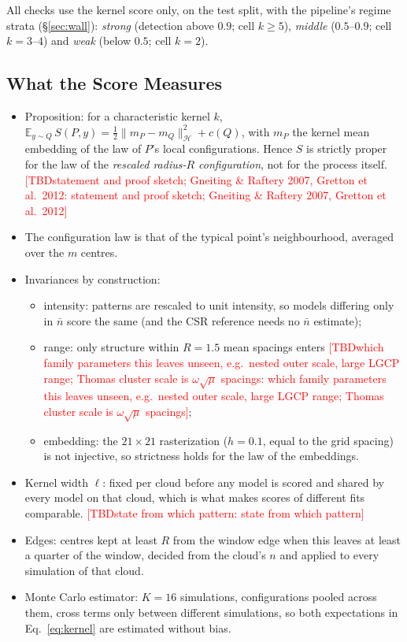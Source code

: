 \documentclass[twoside]{article}
\newcommand{\TBD}[1]{\textcolor{red}{[TBD\ifx\relax#1\relax\else: #1\fi]}}
\newcommand{\nb}{\bar n}
\begin{document}
All checks use the kernel score only, on the test split, with the pipeline's regime strata (\S\ref{sec:wall}):
\emph{strong} (detection above $0.9$; cell $k\ge5$), \emph{middle} ($0.5$--$0.9$; cell $k=3$--$4$) and \emph{weak}
(below $0.5$; cell $k=2$).

\subsection{What the Score Measures}
\label{app:score-def}

\begin{itemize}
  \item Proposition: for a characteristic kernel $k$, $\mathbb{E}_{y\sim Q}\,S(P,y)
        =\tfrac12\|m_P-m_Q\|_{\mathcal H}^2+c(Q)$, with $m_P$ the kernel mean embedding of the law of $P$'s local
        configurations. Hence $S$ is strictly proper for the law of the \emph{rescaled radius-$R$ configuration},
        not for the process itself. \TBD{statement and proof sketch; Gneiting \& Raftery 2007, Gretton et al.\ 2012}
  \item The configuration law is that of the typical point's neighbourhood, averaged over
        the $m$ centres.
  \item Invariances by construction:
  \begin{itemize}
    \item intensity: patterns are rescaled to unit intensity, so models differing only in $\nb$ score the same
          (and the CSR reference needs no $\nb$ estimate);
    \item range: only structure within $R=1.5$ mean spacings enters \TBD{which family parameters this leaves
          unseen, e.g.\ nested outer scale, large LGCP range; Thomas cluster scale is $\omega\sqrt{\mu}$ spacings};
    \item embedding: the $21\times21$ rasterization ($h=0.1$, equal to the grid spacing) is not injective, so
          strictness holds for the law of the embeddings.
  \end{itemize}
  \item Kernel width $\ell$: fixed per cloud before any model is scored and shared by every model on that cloud,
        which is what makes scores of different fits comparable. \TBD{state from which pattern}
  \item Edges: centres kept at least $R$ from the window edge when this leaves at least a quarter of the window,
        decided from the cloud's $n$ and applied to every simulation of that cloud.
  \item Monte Carlo estimator: $K=16$ simulations, configurations pooled across them, cross terms only between
        different simulations, so both expectations in Eq.~\eqref{eq:kernel} are estimated without bias.
\end{itemize}
\end{document}

